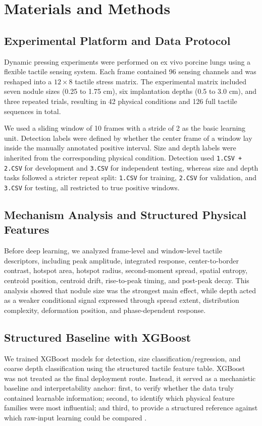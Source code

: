 \section{Materials and Methods}

\subsection{Experimental Platform and Data Protocol}
Dynamic pressing experiments were performed on ex vivo porcine lungs using a flexible tactile sensing system. Each frame contained 96 sensing channels and was reshaped into a $12 \times 8$ tactile stress matrix. The experimental matrix included seven nodule sizes (0.25 to 1.75 cm), six implantation depths (0.5 to 3.0 cm), and three repeated trials, resulting in 42 physical conditions and 126 full tactile sequences in total.

We used a sliding window of 10 frames with a stride of 2 as the basic learning unit. Detection labels were defined by whether the center frame of a window lay inside the manually annotated positive interval. Size and depth labels were inherited from the corresponding physical condition. Detection used \texttt{1.CSV + 2.CSV} for development and \texttt{3.CSV} for independent testing, whereas size and depth tasks followed a stricter repeat split: \texttt{1.CSV} for training, \texttt{2.CSV} for validation, and \texttt{3.CSV} for testing, all restricted to true positive windows.



\subsection{Mechanism Analysis and Structured Physical Features}
Before deep learning, we analyzed frame-level and window-level tactile descriptors, including peak amplitude, integrated response, center-to-border contrast, hotspot area, hotspot radius, second-moment spread, spatial entropy, centroid position, centroid drift, rise-to-peak timing, and post-peak decay. This analysis showed that nodule size was the strongest main effect, while depth acted as a weaker conditional signal expressed through spread extent, distribution complexity, deformation position, and phase-dependent response.

\subsection{Structured Baseline with XGBoost}
We trained XGBoost models for detection, size classification/regression, and coarse depth classification using the structured tactile feature table. XGBoost was not treated as the final deployment route. Instead, it served as a mechanistic baseline and interpretability anchor: first, to verify whether the data truly contained learnable information; second, to identify which physical feature families were most influential; and third, to provide a structured reference against which raw-input learning could be compared \cite{chen2016xgboost}.

